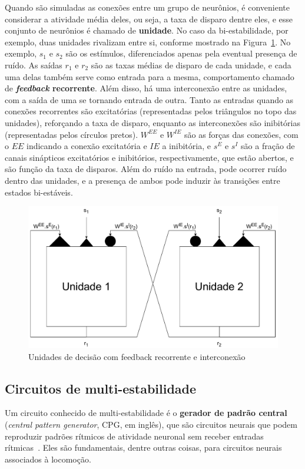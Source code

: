 Quando são simuladas as conexões entre um grupo de neurônios, é conveniente considerar a atividade média deles, ou seja, a taxa de disparo dentre eles, e esse conjunto de neurônios é chamado de \textbf{unidade}. No caso da bi-estabilidade, por exemplo, duas unidades rivalizam entre si, conforme mostrado na Figura~\ref{fig:unidadesdecisao}. No exemplo, $s_1$ e $s_2$ são os estímulos, diferenciados apenas pela eventual presença de ruído. As saídas $r_1$ e $r_2$ são as taxas médias de disparo de cada unidade, e cada uma delas também serve como entrada para a mesma, comportamento chamado de \textbf{\textit{feedback} recorrente}. Além disso, há uma interconexão entre as unidades, com a saída de uma se tornando entrada de outra. Tanto as entradas quando as conexões recorrentes são excitatórias (representadas pelos triângulos no topo das unidades), reforçando a taxa de disparo, enquanto as interconexões são inibitórias (representadas pelos círculos pretos). $W^{EE}$ e $W^{IE}$ são as forças das conexões, com o $EE$ indicando a conexão excitatória e $IE$ a inibitória, e $s^E$ e $s^I$ são a fração de canais sinápticos excitatórios e inibitórios, respectivamente, que estão abertos, e são função da taxa de disparos. Além do ruído na entrada, pode ocorrer ruído dentro das unidades, e a presença de ambos pode induzir às transições entre estados bi-estáveis.


\begin{figure}[tb]
	\centering
	\caption[Unidades de decisão com feedback recorrente e interconexão]{Unidades de decisão com feedback recorrente e interconexão}
	\label{fig:unidadesdecisao}
	\includegraphics[width=0.7\linewidth]{figs/unidades_decisao}
\end{figure}

\subsection{Circuitos de multi-estabilidade}
Um circuito conhecido de multi-estabilidade é o \textbf{gerador de padrão central} (\textit{central pattern generator}, CPG, em inglês), que são circuitos neurais que podem reproduzir padrões rítmicos de atividade neuronal sem receber entradas rítmicas~\cite{ijspeert_central_2008}. Eles são fundamentais, dentre outras coisas, para circuitos neurais associados à locomoção.

